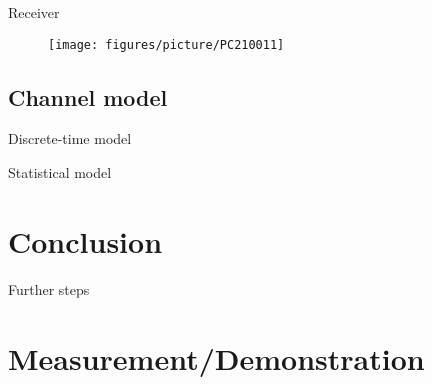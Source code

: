 \documentclass[xetex, onlymath, handout]{beamer}
\begin{document}
\begin{frame}{Receiver}
  \begin{figure}
    \centering
    \texttt{[image: figures/picture/PC210011]}
  \end{figure}
\end{frame}



\subsection{Channel model}

\begin{frame}{Discrete-time model}

\end{frame}

\begin{frame}{Statistical model}
	
\end{frame}

\section{Conclusion}

\begin{frame}{Further steps}
	
\end{frame}

\section{Measurement/Demonstration}

\end{document}
